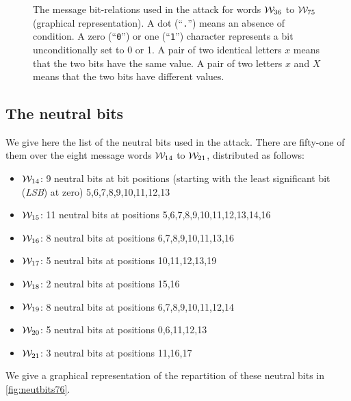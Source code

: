 \begin{figure}[ht]
\centering
  \theverbbox
  \caption{The message bit-relations used in the attack for words $\mathcal{W}_{36}$ to $\mathcal{W}_{75}$ (graphical representation).
  A dot (``\texttt{.}'') means an absence of condition. A zero (``\texttt{0}'') or one (``\texttt{1}'') character represents a bit unconditionally set to 0 or 1.
  A pair of two identical letters $x$ means that the two bits have the same value. A pair of two
  letters $x$ and $X$ means that the two bits have different values.
  \label{fig:msgbitrel76_graph}}
\end{figure}

\subsection{The neutral bits}
\label{sec:neutral_bits76}
We give here the list of the neutral bits used in the attack.
There are fifty-one of them over the eight message words
$\mathcal{W}_{14}$ to $\mathcal{W}_{21}$, distributed as
follows:
\begin{itemize}
\item $\mathcal{W}_{14}$: 9 neutral bits at  bit positions (starting with the least significant bit (\emph{LSB}) at zero) 5,6,7,8,9,10,11,12,13
\item $\mathcal{W}_{15}$: 11 neutral bits at positions 5,6,7,8,9,10,11,12,13,14,16
\item $\mathcal{W}_{16}$: 8 neutral bits at positions 6,7,8,9,10,11,13,16
\item $\mathcal{W}_{17}$: 5 neutral bits at positions 10,11,12,13,19
\item $\mathcal{W}_{18}$: 2 neutral bits at positions 15,16
\item $\mathcal{W}_{19}$: 8 neutral bits at positions 6,7,8,9,10,11,12,14
\item $\mathcal{W}_{20}$: 5 neutral bits at positions 0,6,11,12,13
\item $\mathcal{W}_{21}$: 3 neutral bits at positions 11,16,17
\end{itemize}
We give a graphical representation of the repartition of these neutral bits in \autoref{fig:neutbits76}.

